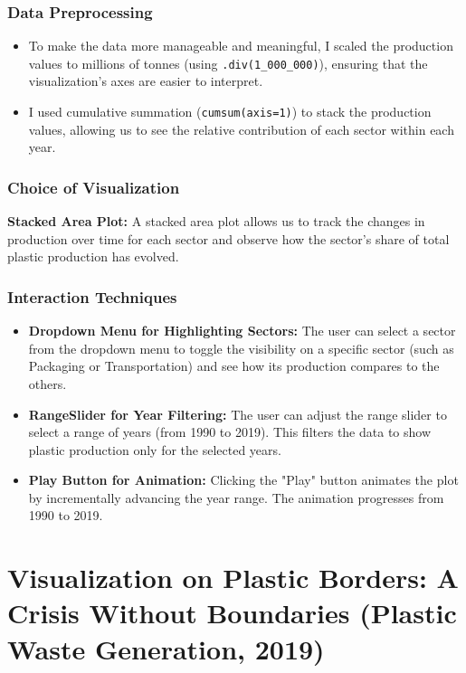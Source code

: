 \documentclass{article}
\begin{document}
\subsubsection{Data Preprocessing}
\begin{itemize}
    \item To make the data more manageable and meaningful, I scaled the production values to millions of tonnes (using \texttt{.div(1\_000\_000)}), ensuring that the visualization’s axes are easier to interpret.
    \item I used cumulative summation (\texttt{cumsum(axis=1)}) to stack the production values, allowing us to see the relative contribution of each sector within each year. 
\end{itemize}

\subsubsection{Choice of Visualization}
\textbf{Stacked Area Plot:} A stacked area plot allows us to track the changes in production over time for each sector and observe how the sector’s share of total plastic production has evolved. 

\subsubsection{Interaction Techniques}
\begin{itemize}
\item\textbf{Dropdown Menu for Highlighting Sectors:} The user can select a sector from the dropdown menu to toggle the visibility on a specific sector (such as Packaging or Transportation) and see how its production compares to the others. 
\item \textbf{RangeSlider for Year Filtering:} The user can adjust the range slider to select a range of years (from 1990 to 2019). This filters the data to show plastic production only for the selected years.
\item \textbf{Play Button for Animation:} Clicking the "Play" button animates the plot by incrementally advancing the year range. The animation progresses from 1990 to 2019.
\end{itemize}

\section{Visualization on Plastic Borders: A Crisis Without Boundaries (Plastic Waste Generation, 2019)}
\end{document}
